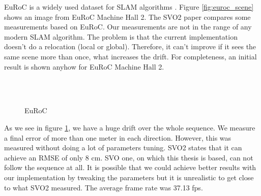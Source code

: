 \documentclass[11pt,a4paper,titlepage,oneside]{report}
\begin{document}
EuRoC is a widely used dataset for SLAM algorithms \cite{euroc}. Figure \ref{fig:euroc_scene} shows an image from EuRoC Machine Hall 2. The SVO2 paper \cite{svo2} compares some measurements based on EuRoC. Our measurements are not in the range of any modern SLAM algorithm. The problem is that the current implementation doesn't do a relocation (local or global). Therefore, it can't improve if it sees the same scene more than once, what increases the drift. For completeness, an initial result is shown anyhow for EuRoC Machine Hall 2.

\begin{figure}[H]
  \\
  \\
  \caption{EuRoC }\label{fig:euroc}
\end{figure}

As we see in figure \ref{fig:euroc}, we have a huge drift over the whole sequence. We measure a final error of more than one meter in each direction. However, this was measured without doing a lot of parameters tuning. SVO2 states that it can achieve an RMSE of only 8 cm. SVO one, on which this thesis is based, can not follow the sequence at all. It is possible that we could achieve better results with our implementation by tweaking the parameters but it is unrealistic to get close to what SVO2 measured. The average frame rate was 37.13 fps.
\end{document}

